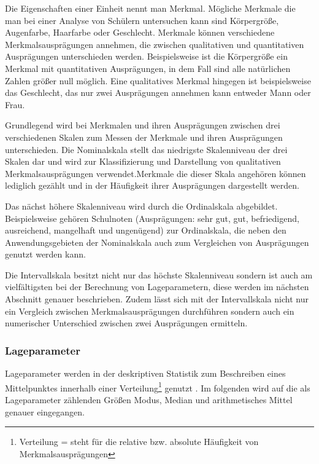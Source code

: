 Die Eigenschaften einer Einheit nennt man Merkmal. Mögliche Merkmale die man bei einer Analyse von Schülern untersuchen kann sind Körpergröße, Augenfarbe, Haarfarbe oder Geschlecht. Merkmale können verschiedene Merkmalsausprägungen annehmen, die zwischen qualitativen und quantitativen Ausprägungen unterschieden werden. Beispielsweise ist die Körpergröße ein Merkmal mit quantitativen Ausprägungen, in dem Fall sind alle natürlichen Zahlen größer null möglich. Eine qualitatives Merkmal hingegen ist beispielsweise das Geschlecht, das nur zwei Ausprägungen annehmen kann entweder Mann oder Frau.

Grundlegend wird bei Merkmalen und ihren Ausprägungen zwischen drei verschiedenen Skalen zum Messen der Merkmale und ihren Ausprägungen unterschieden. Die Nominalskala stellt das niedrigste Skalenniveau der drei Skalen dar und wird zur Klassifizierung und Darstellung von qualitativen Merkmalsausprägungen verwendet.Merkmale die dieser Skala angehören können lediglich gezählt und in der Häufigkeit ihrer Ausprägungen dargestellt werden.

Das nächst höhere Skalenniveau wird durch die Ordinalskala abgebildet. Beispielsweise gehören Schulnoten (Ausprägungen: sehr gut, gut, befriedigend, ausreichend, mangelhaft und ungenügend) zur Ordinalskala, die neben den Anwendungsgebieten der Nominalskala auch zum Vergleichen von Ausprägungen genutzt werden kann.

Die Intervallskala besitzt nicht nur das höchste Skalenniveau sondern ist auch am vielfältigsten bei der Berechnung von Lageparametern, diese werden im nächsten Abschnitt genauer beschrieben. Zudem lässt sich mit der Intervallskala nicht nur ein Vergleich zwischen Merkmalsausprägungen durchführen sondern auch ein numerischer Unterschied zwischen zwei Ausprägungen ermitteln.


\subsubsection{Lageparameter}
Lageparameter werden in der deskriptiven Statistik zum Beschreiben eines Mittelpunktes innerhalb einer Verteilung\footnote{Verteilung = steht für die relative bzw. absolute Häufigkeit von Merkmalsausprägungen} genutzt \citep[vgl.][49]{Fahrmeir2016}. Im folgenden wird auf die als Lageparameter zählenden Größen Modus, Median und arithmetisches Mittel genauer eingegangen.

